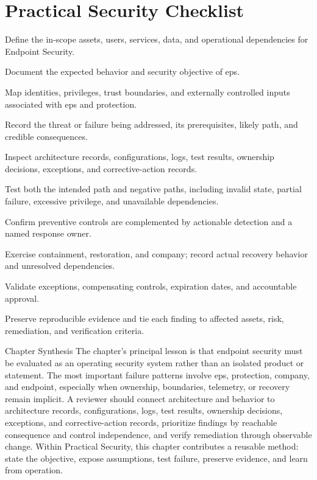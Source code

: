 \documentclass[11pt,letterpaper]{article}
\begin{document}
\section*{Practical Security Checklist}
\begin{CornellChecklist}
\item Define the in-scope assets, users, services, data, and operational dependencies for Endpoint Security.
\item Document the expected behavior and security objective of eps.
\item Map identities, privileges, trust boundaries, and externally controlled inputs associated with eps and protection.
\item Record the threat or failure being addressed, its prerequisites, likely path, and credible consequences.
\item Inspect architecture records, configurations, logs, test results, ownership decisions, exceptions, and corrective-action records.
\item Test both the intended path and negative paths, including invalid state, partial failure, excessive privilege, and unavailable dependencies.
\item Confirm preventive controls are complemented by actionable detection and a named response owner.
\item Exercise containment, restoration, and company; record actual recovery behavior and unresolved dependencies.
\item Validate exceptions, compensating controls, expiration dates, and accountable approval.
\item Preserve reproducible evidence and tie each finding to affected assets, risk, remediation, and verification criteria.
\end{CornellChecklist}
\begin{CornellSummaryBox}{Chapter Synthesis}
The chapter's principal lesson is that endpoint security must be evaluated as an operating security system rather than an isolated product or statement. The most important failure patterns involve eps, protection, company, and endpoint, especially when ownership, boundaries, telemetry, or recovery remain implicit. A reviewer should connect architecture and behavior to architecture records, configurations, logs, test results, ownership decisions, exceptions, and corrective-action records, prioritize findings by reachable consequence and control independence, and verify remediation through observable change. Within Practical Security, this chapter contributes a reusable method: state the objective, expose assumptions, test failure, preserve evidence, and learn from operation.
\end{CornellSummaryBox}
\end{document}

